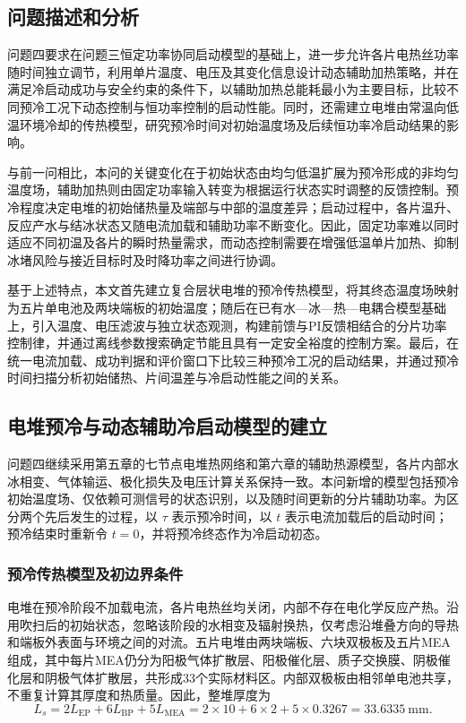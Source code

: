 \subsection{问题描述和分析}

问题四要求在问题三恒定功率协同启动模型的基础上，进一步允许各片电热丝功率随时间独立调节，利用单片温度、电压及其变化信息设计动态辅助加热策略，并在满足冷启动成功与安全约束的条件下，以辅助加热总能耗最小为主要目标，比较不同预冷工况下动态控制与恒功率控制的启动性能。同时，还需建立电堆由常温向低温环境冷却的传热模型，研究预冷时间对初始温度场及后续恒功率冷启动结果的影响。

与前一问相比，本问的关键变化在于初始状态由均匀低温扩展为预冷形成的非均匀温度场，辅助加热则由固定功率输入转变为根据运行状态实时调整的反馈控制。预冷程度决定电堆的初始储热量及端部与中部的温度差异；启动过程中，各片温升、反应产水与结冰状态又随电流加载和辅助功率不断变化。因此，固定功率难以同时适应不同初温及各片的瞬时热量需求，而动态控制需要在增强低温单片加热、抑制冰堵风险与接近目标时及时降功率之间进行协调。

基于上述特点，本文首先建立复合层状电堆的预冷传热模型，将其终态温度场映射为五片单电池及两块端板的初始温度；随后在已有水—冰—热—电耦合模型基础上，引入温度、电压滤波与独立状态观测，构建前馈与PI反馈相结合的分片功率控制律，并通过离线参数搜索确定节能且具有一定安全裕度的控制方案。最后，在统一电流加载、成功判据和评价窗口下比较三种预冷工况的启动结果，并通过预冷时间扫描分析初始储热、片间温差与冷启动性能之间的关系。

\subsection{电堆预冷与动态辅助冷启动模型的建立}

问题四继续采用第五章的七节点电堆热网络和第六章的辅助热源模型，各片内部水冰相变、气体输运、极化损失及电压计算关系保持一致。本问新增的模型包括预冷初始温度场、仅依赖可测信号的状态识别，以及随时间更新的分片辅助功率。为区分两个先后发生的过程，以 $\tau$ 表示预冷时间，以 $t$ 表示电流加载后的启动时间；预冷结束时重新令 $t=0$，并将预冷终态作为冷启动初态。

\subsubsection{预冷传热模型及初边界条件}

电堆在预冷阶段不加载电流，各片电热丝均关闭，内部不存在电化学反应产热。沿用吹扫后的初始状态，忽略该阶段的水相变及辐射换热，仅考虑沿堆叠方向的导热和端板外表面与环境之间的对流。五片电堆由两块端板、六块双极板及五片MEA组成，其中每片MEA仍分为阳极气体扩散层、阳极催化层、质子交换膜、阴极催化层和阴极气体扩散层，共形成33个实际材料区。内部双极板由相邻单电池共享，不重复计算其厚度和热质量。因此，整堆厚度为
\begin{equation}
L_s=2L_{\mathrm{EP}}+6L_{\mathrm{BP}}+5L_{\mathrm{MEA}}
=2\times10+6\times2+5\times0.3267=33.6335\ \mathrm{mm}.
\tag{7-1}\label{eq:q4:stack_length}
\end{equation}

